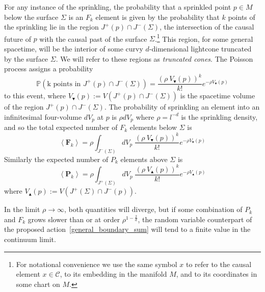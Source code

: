 \documentclass[12pt]{article}
\newcommand{\be}{\begin{equation}}
\newcommand{\ee}{\end{equation}}
\newcommand{\F}[1]{F_{#1}}
\renewcommand{\P}[1]{P_{#1}}
\newcommand{\BF}[1]{\mathbf{F}_{#1}}
\newcommand{\BP}[1]{\mathbf{P}_{#1}}
\begin{document}
For any instance of the sprinkling, the probability that a sprinkled point $p\in M$ below the surface $\Sigma$ is an $F_k$ element is given by the probability that $k$ points of the sprinkling lie in the region $J^{+} (p)\cap J^{-} (\Sigma)$, the intersection of the causal future of $p$ with the causal past of the surface $\Sigma$.\footnote{For notational convenience we use the same symbol $x$ to refer to the causal element $x\in\mathcal C$, to its embedding in the manifold $M$, and to its coordinates in some chart on $M$.} This region, for some general spacetime, will be the interior of some curvy $d$-dimensional lightcone truncated by the surface $\Sigma$. We will refer to these regions as \emph{truncated cones}. The Poisson process assigns a probability
\be\label{Poisson}
\mathbb P\left (\text{k points in }J^{+} (p)\cap J^{-} (\Sigma)\right)=\frac{\left (\rho\: V_\blacktriangledown (p)\right)^k}{k!}e^{-\rho V_\blacktriangledown (p)}
\ee
to this event, where $V_\blacktriangledown (p):= V (J^{+} (p)\cap J^{-} (\Sigma))$ is the spacetime volume of the region $J^{+} (p)\cap J^{-} (\Sigma)$. The probability of sprinkling an element into an infinitesimal four-volume $dV_p$ at $p$ is $\rho dV_p$ where $\rho=l^{-d}$ is the sprinkling density, and so the total expected number of $\F{k}$ elements below $\Sigma$ is
\be\label{eq:nmax}
\left\langle \BF{k}\right\rangle =\rho\int_{J^{-} (\Sigma)}dV_p\; \frac{\left (\rho\: V_\blacktriangledown (p)\right)^k}{k!}e^{-\rho V_\blacktriangledown (p)}
\ee
Similarly the expected number of $\P{k}$ elements above $\Sigma$ is
\be\label{eq:nmin}
\left\langle \BP{k}\right\rangle =\rho\int_{J^{+} (\Sigma)}dV_p\; \frac{\left (\rho\: V_\blacktriangle (p)\right)^k}{k!}e^{-\rho V_\blacktriangle (p)}
\ee
where $V_\blacktriangle (p):= V (J^{+} (\Sigma)\cap J^{-} (p))$.

In the limit $\rho\rightarrow\infty$, both quantities will diverge, but if some combination of $\P{k}$ and $\F{k}$ grows slower than or at order $\rho^{1-\frac2d}$, the random variable counterpart of the proposed action~\eqref{general_boundary_sum} will tend to a finite value in the continuum limit.
\end{document}
